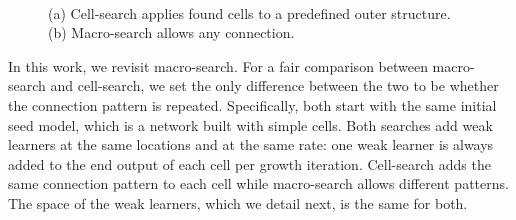 \begin{figure}
\centering
{}
~
\caption{(a) Cell-search applies found cells to a predefined outer structure. (b) Macro-search allows any connection. }
\label{fig:cell_vs_macro_search}
\end{figure}

In this work, we revisit macro-search. 
For a fair comparison between macro-search and cell-search, 
we set the only difference between the two to be whether the connection pattern is repeated. 
Specifically, both start with the same initial seed model, which is a network built with simple cells.
Both searches add weak learners at the same locations and at the same rate: one weak learner is always added to the end output of each cell per growth iteration.  Cell-search adds the same connection pattern to each cell while macro-search allows different patterns. 
The space of the weak learners, which we detail next, is the same for both. 



